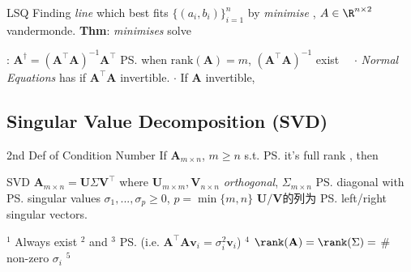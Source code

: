 \documentclass{note}
\begin{document}
\begin{MyTh}{LSQ}
  Finding \textit{line} which best fits $\{(a_i,b_i)\}_{i=1}^n$ by \textit{minimise} , $A\in\R^{n\times 2}$ vandermonde. \quad
  \textbf{Thm}: \textit{minimises}  solve  

  \quad \footnotesize {}: $\mathbf{A}^\dagger = (\mathbf{A}^\top\mathbf{A})^{-1}\mathbf{A}^\top$ \ps{\tiny when $\text{rank}(\mathbf{A})=m$, $(\mathbf{A}^\top \mathbf{A})^{-1}$ exist} \ \ $\cdot$ \textit{Normal Equations} has  if $\mathbf{A}^\top\mathbf{A}$ invertible. \quad $\cdot$ If $\mathbf{A}$ invertible, 
\end{MyTh}


\subsection{Singular Value Decomposition (SVD)}

\begin{MyTh}{2nd Def of Condition Number}
  If $\mathbf{A}_{m\times n}$, $m\geq n$ s.t. \ps{it's full rank }, then  \quad {} \quad {}
\end{MyTh}

\vspace{-2pt}
\begin{MyTh}{SVD}
  $\mathbf{A}_{m\times n}=\mathbf{U}\Sigma\mathbf{V}^\top$ \quad where $\mathbf{U}_{m\times m},\mathbf{V}_{n\times n}$ \textit{orthogonal}, $\Sigma_{m\times n}$ \ps{diagonal} with \ps{singular values} $\sigma_1,...,\sigma_p\geq0$, $p=\min\{m,n\}$ \quad $\mathbf{U}/\mathbf{V}$的列为 \ps{left/right singular vectors}.

  \quad \footnotesize $^1$ Always exist \quad $^2$  and  \quad $^3$  \ps{(i.e. $\mathbf{A}^\top\mathbf{A}\mathbf{v}_i=\sigma_i^2\mathbf{v}_i$)} \quad $^4$ $\rank(\mathbf{A})=\rank(\Sigma)=$ \# non-zero $\sigma_i$ \quad $^5$ 
\end{MyTh}
\end{document}
